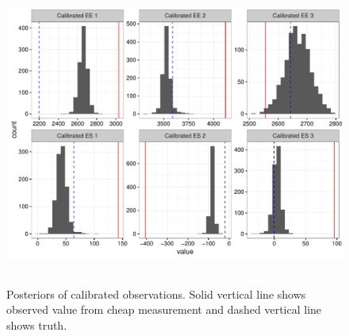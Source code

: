\documentclass[11pt]{article}\usepackage[]{graphicx}\usepackage[]{color}
\begin{document}
  
  
  
  
  \begin{figure}
  \centering
  \includegraphics[width=17cm,height=10cm]{manual_figure/wpcalhist.pdf}
  \caption{Posteriors of calibrated observations. Solid vertical line shows observed value from cheap measurement and dashed vertical line shows truth.}
  \label{wpcalhist}
  \end{figure}
  
  
  
\end{document}

